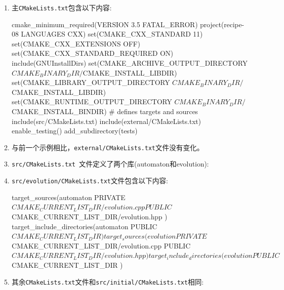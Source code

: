 \begin{enumerate}
\item 主\texttt{CMakeLists.txt}包含以下内容:

\begin{codebox}[cmake]
cmake_minimum_required(VERSION 3.5 FATAL_ERROR)
project(recipe-08 LANGUAGES CXX)
set(CMAKE_CXX_STANDARD 11)
set(CMAKE_CXX_EXTENSIONS OFF)
set(CMAKE_CXX_STANDARD_REQUIRED ON)
include(GNUInstallDirs)
set(CMAKE_ARCHIVE_OUTPUT_DIRECTORY
${CMAKE_BINARY_DIR}/${CMAKE_INSTALL_LIBDIR})
set(CMAKE_LIBRARY_OUTPUT_DIRECTORY
${CMAKE_BINARY_DIR}/${CMAKE_INSTALL_LIBDIR})
set(CMAKE_RUNTIME_OUTPUT_DIRECTORY
${CMAKE_BINARY_DIR}/${CMAKE_INSTALL_BINDIR})
# defines targets and sources
include(src/CMakeLists.txt)
include(external/CMakeLists.txt)
enable_testing()
add_subdirectory(tests)
\end{codebox}

\item 与前一个示例相比，\texttt{external/CMakeLists.txt}文件没有变化。

\item \texttt{src/CMakeLists.txt }文件定义了两个库(automaton和evolution):


\item \texttt{src/evolution/CMakeLists.txt}文件包含以下内容:

\begin{codebox}[cmake]
target_sources(automaton
  PRIVATE
    ${CMAKE_CURRENT_LIST_DIR}/evolution.cpp
  PUBLIC
    ${CMAKE_CURRENT_LIST_DIR}/evolution.hpp
  )
target_include_directories(automaton
  PUBLIC
    ${CMAKE_CURRENT_LIST_DIR}
  )
target_sources(evolution
  PRIVATE
    ${CMAKE_CURRENT_LIST_DIR}/evolution.cpp
  PUBLIC
    ${CMAKE_CURRENT_LIST_DIR}/evolution.hpp
  )
target_include_directories(evolution
  PUBLIC
    ${CMAKE_CURRENT_LIST_DIR}
  )
\end{codebox}

\item 其余\texttt{CMakeLists.txt}文件和\texttt{src/initial/CMakeLists.txt}相同:


\end{enumerate}
